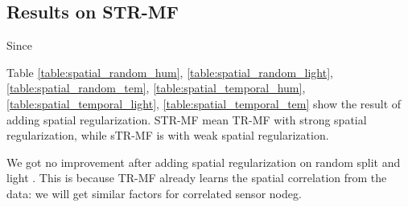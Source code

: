\subsection{Results on STR-MF} \label{experimental_results_spatial}
Since

Table \ref{table:spatial_random_hum}, \ref{table:spatial_random_light}, \ref{table:spatial_random_tem}, \ref{table:spatial_temporal_hum}, \ref{table:spatial_temporal_light}, \ref{table:spatial_temporal_tem}  show the result of adding spatial regularization. 
STR-MF mean TR-MF with strong spatial regularization, while sTR-MF is with weak spatial regularization.

We got no improvement after adding spatial regularization on random split and light 
. This is because TR-MF already learns the spatial correlation from the data: we will get similar factors for correlated sensor nodeg. 

